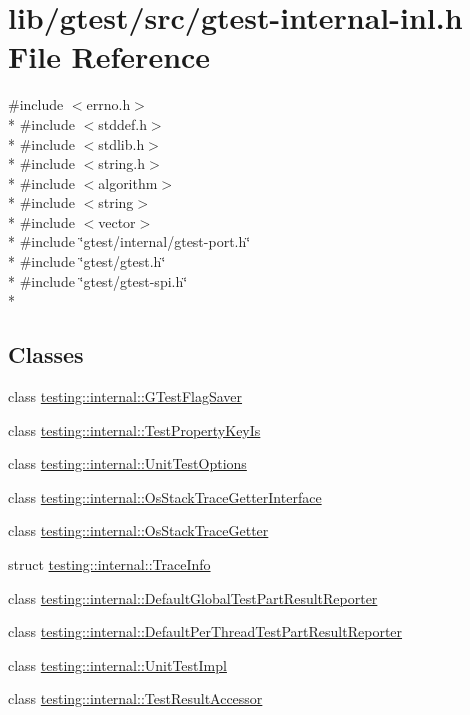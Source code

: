 \hypertarget{gtest-internal-inl_8h}{\section{lib/gtest/src/gtest-\/internal-\/inl.h File Reference}
\label{gtest-internal-inl_8h}
}
{\ttfamily \#include $<$errno.\-h$>$}\\*
{\ttfamily \#include $<$stddef.\-h$>$}\\*
{\ttfamily \#include $<$stdlib.\-h$>$}\\*
{\ttfamily \#include $<$string.\-h$>$}\\*
{\ttfamily \#include $<$algorithm$>$}\\*
{\ttfamily \#include $<$string$>$}\\*
{\ttfamily \#include $<$vector$>$}\\*
{\ttfamily \#include \char`\"{}gtest/internal/gtest-\/port.\-h\char`\"{}}\\*
{\ttfamily \#include \char`\"{}gtest/gtest.\-h\char`\"{}}\\*
{\ttfamily \#include \char`\"{}gtest/gtest-\/spi.\-h\char`\"{}}\\*
\subsection*{Classes}
\begin{DoxyCompactItemize}
\item 
class \hyperlink{classtesting_1_1internal_1_1_g_test_flag_saver}{testing\-::internal\-::\-G\-Test\-Flag\-Saver}
\item 
class \hyperlink{classtesting_1_1internal_1_1_test_property_key_is}{testing\-::internal\-::\-Test\-Property\-Key\-Is}
\item 
class \hyperlink{classtesting_1_1internal_1_1_unit_test_options}{testing\-::internal\-::\-Unit\-Test\-Options}
\item 
class \hyperlink{classtesting_1_1internal_1_1_os_stack_trace_getter_interface}{testing\-::internal\-::\-Os\-Stack\-Trace\-Getter\-Interface}
\item 
class \hyperlink{classtesting_1_1internal_1_1_os_stack_trace_getter}{testing\-::internal\-::\-Os\-Stack\-Trace\-Getter}
\item 
struct \hyperlink{structtesting_1_1internal_1_1_trace_info}{testing\-::internal\-::\-Trace\-Info}
\item 
class \hyperlink{classtesting_1_1internal_1_1_default_global_test_part_result_reporter}{testing\-::internal\-::\-Default\-Global\-Test\-Part\-Result\-Reporter}
\item 
class \hyperlink{classtesting_1_1internal_1_1_default_per_thread_test_part_result_reporter}{testing\-::internal\-::\-Default\-Per\-Thread\-Test\-Part\-Result\-Reporter}
\item 
class \hyperlink{classtesting_1_1internal_1_1_unit_test_impl}{testing\-::internal\-::\-Unit\-Test\-Impl}
\item 
class \hyperlink{classtesting_1_1internal_1_1_test_result_accessor}{testing\-::internal\-::\-Test\-Result\-Accessor}
\end{DoxyCompactItemize}
